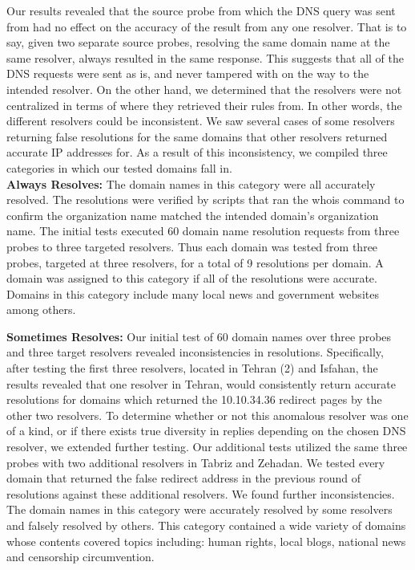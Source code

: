         Our results revealed that the source probe from which the DNS query was sent from had no effect on the accuracy of the result from any one resolver. That is to say, given two separate source probes, resolving the same domain name at the same resolver, always resulted in the same response. This suggests that all of the DNS requests were sent as is, and never tampered with on the way to the intended resolver. On the other hand, we determined that the resolvers were not centralized in terms of where they retrieved their rules from. In other words, the different resolvers could be inconsistent. We saw several cases of some resolvers returning false resolutions for the same domains that other resolvers returned accurate IP addresses for. As a result of this inconsistency, we compiled three categories in which our tested domains fall in.\\


\textbf{Always Resolves:} The domain names in this category were all accurately resolved. The resolutions were verified by scripts that ran the whois command to confirm the organization name matched the intended domain$’$s organization name. The initial tests executed 60 domain name resolution requests from three probes to three targeted resolvers. Thus each domain was tested from three probes, targeted at three resolvers, for a total of 9 resolutions per domain. A domain was assigned to this category if all of the resolutions were accurate. Domains in this category include many local news and government websites among others.

\textbf{Sometimes Resolves:} Our initial test of 60 domain names over three probes and three target resolvers revealed inconsistencies in resolutions. Specifically, after testing the first three resolvers, located in Tehran (2) and Isfahan, the results revealed that one resolver in Tehran, would consistently return accurate resolutions for domains which returned the 10.10.34.36 redirect pages by the other two resolvers. To determine whether or not this anomalous resolver was one of a kind, or if there exists true diversity in replies depending on the chosen DNS resolver, we extended further testing. Our additional tests utilized the same three probes with two additional resolvers in Tabriz and Zehadan. We tested every domain that returned the false redirect address in the previous round of resolutions against these additional resolvers. We found further inconsistencies. The domain names in this category were accurately resolved by some resolvers and falsely resolved by others. This category contained a wide variety of domains whose contents covered topics including: human rights, local blogs, national news and censorship circumvention.

